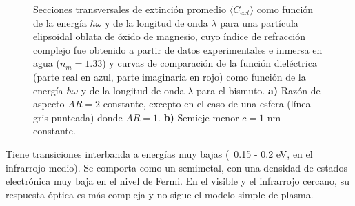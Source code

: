 \begin{figure}[H]
	\quad%
	\caption{Secciones transversales de extinción promedio $\langle C_{ext}\rangle$ como función de la energía $\hbar\omega$ y de la longitud de onda $\lambda$ para una partícula elipsoidal oblata de óxido de magnesio, cuyo índice de refracción complejo fue obtenido a partir de datos experimentales  e inmersa en agua ($n_m=1.33$) y curvas de comparación de la función dieléctrica (parte real en azul, parte imaginaria en rojo) como función de la energía $\hbar\omega$ y de la longitud de onda $\lambda$ para el bismuto. \textbf{a)} Razón de aspecto $AR=2$ constante, excepto en el caso de una esfera (línea gris punteada) donde $AR=1$. \textbf{b)} Semieje menor $c=1$ nm constante.}\label{mgo}
\end{figure}

Tiene transiciones interbanda a energías muy bajas (~0.15 - 0.2 eV, en el infrarrojo medio).
Se comporta como un semimetal, con una densidad de estados electrónica muy baja en el nivel de Fermi.
En el visible y el infrarrojo cercano, su respuesta óptica es más compleja y no sigue el modelo simple de plasma.







